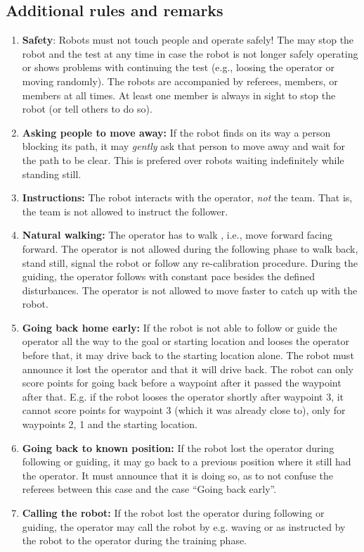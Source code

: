 \subsection{Additional rules and remarks}
\begin{enumerate}
\item \textbf{Safety}: Robots must not touch people and operate safely! 
  The \TC may stop the robot and the test at any time in case the robot is not longer safely operating or shows problems with continuing the test (e.g., loosing the operator or moving randomly).
  The robots are accompanied by referees, \OC members, or \TC members at all times.
  At least one \TC member is always in sight to stop the robot (or tell others to do so).
\item \textbf{Asking people to move away:} If the robot finds on its way a person blocking its path, it may \textit{gently} ask that person to move away and wait for the path to be clear. 
  This is prefered over robots waiting indefinitely while standing still. 
\item \textbf{Instructions:} The robot interacts with the operator, \emph{not} the team. 
  That is, the team is not allowed to instruct the follower.
\item \textbf{Natural walking:} The operator has to walk , i.e., move forward facing forward. 
  The operator is not allowed during the following phase to walk back, stand still, signal the robot or follow any re-calibration procedure.
  During the guiding, the operator follows with constant pace besides the defined disturbances. 
  The operator is not allowed to move faster to catch up with the robot. 
\item \textbf{Going back home early: } If the robot is not able to follow or guide the operator all the way to the goal or starting location and looses the operator before that, it may drive back to the starting location alone.
  The robot must announce it lost the operator and that it will drive back. 
  The robot can only score points for going back before a waypoint after it passed the waypoint after that. 
  E.g. if the robot looses the operator shortly after waypoint 3, it cannot score points for waypoint 3 (which it was already close to), only for waypoints 2, 1 and the starting location.
\item \textbf{Going back to known position: } If the robot lost the operator during following or guiding, it may go back to a previous position where it still had the operator. 
  It must announce that it is doing so, as to not confuse the referees between this case and the case ``Going back early''. 
\item \textbf{Calling the robot: } If the robot lost the operator during following or guiding, 
  the operator may call the robot by e.g. waving or as instructed by the robot to the operator during the training phase. 
\end{enumerate}


